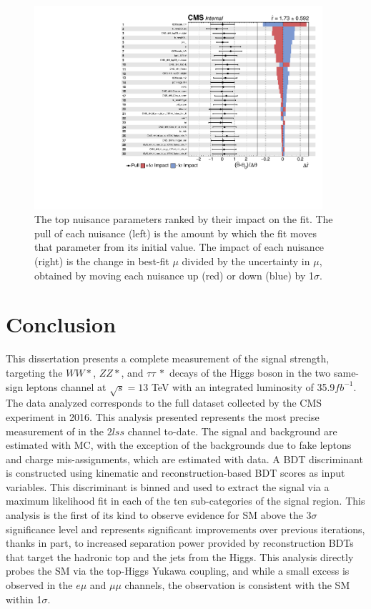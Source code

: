 \begin{figure}[htb]
        \centering 
        \includegraphics[width=0.95\textwidth]{ch11_figs/impacts_ttH_13TeV_top30.pdf}
        \caption[Nuisance parameter impacts]{The top nuisance parameters ranked by their impact on the fit. The pull of each nuisance (left) is the amount by which the fit moves that parameter from its
        initial value. The impact of each nuisance (right) is the change in best-fit $\mu$ divided by the uncertainty in $\mu$, obtained by moving each nuisance up (red) or down (blue) by 1$\sigma$.}
        \label{fig:impacts}
\end{figure}



\section{Conclusion}
This dissertation presents a complete measurement of the \tth signal strength, targeting the $WW*$, $ZZ*$, and $\tau\tau~*$ decays of the Higgs boson
in the two same-sign leptons channel at $\sqrt{s} = 13$ TeV with an integrated luminosity of 35.9$fb^{-1}$.
The data analyzed corresponds to the full dataset collected by the CMS experiment in 2016.
This analysis presented represents the most precise measurement of \tth in the $2lss$ channel to-date.
The signal and background are estimated with MC, with the exception of the backgrounds due to fake leptons and charge mis-assignments,
which are estimated with data. A BDT discriminant is constructed using kinematic and reconstruction-based BDT scores as input variables.
This discriminant is binned and used to extract the signal via a maximum likelihood fit in each of the ten sub-categories of the signal region.
This analysis is the first of its kind to observe evidence for SM \tth above the 3$\sigma$ significance level and represents significant
improvements over previous iterations, thanks in part, to increased separation power provided by reconstruction BDTs that target the hadronic top
and the jets from the Higgs. This analysis directly probes the SM via the top-Higgs Yukawa coupling, and while a small excess is observed
in the $e\mu$ and $\mu\mu$ channels, the observation is consistent with the SM within 1$\sigma$. 


